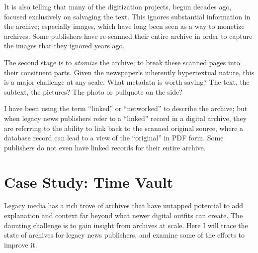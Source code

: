 It is also telling that many of the digitization projects, begun decades ago, focused exclusively on salvaging the text. This ignores substantial information in the archive; especially images, which have long been seen as a way to monetize archives. %
Some publishers have re-scanned their entire archive in order to capture the images that they ignored years ago.  %

The second stage is to \emph{atomize} the archive; to break these scanned pages into their consituent parts. Given the newspaper's inherently hypertextual nature, this is a major challenge at any scale. What metadata is worth saving? The text, the subtext, the pictures? The photo or pullquote on the side?

I have been using the term ``linked'' or ``networked'' to describe the archive; but when legacy news publishers refer to a ``linked'' record in a digital archive, they are referring to the ability to link back to the scanned original source, where a database record can lead to a view of the ``original'' in PDF form. Some publishers do not even have linked records for their entire archive.


\section{Case Study: Time Vault}


Legacy media has a rich trove of archives that have untapped potential to add explanation and context far beyond what newer digital outfits can create. The daunting challenge is to gain insight from archives at scale. Here I will trace the state of archives for legacy news publishers, and examine some of the efforts to improve it.



